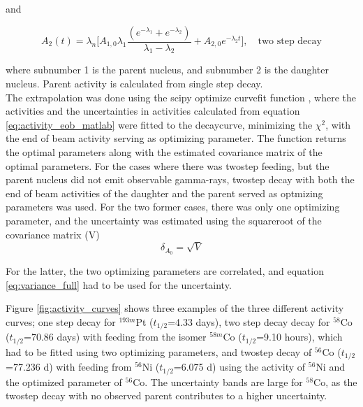 and

\begin{equation} \label{eq:twostep_activity}
    A_2(t) = \lambda_n \Big[ A_{1,0}\lambda_1 \frac{(e^{-\lambda_1 } + e^{-\lambda_2})}{\lambda_1 - \lambda _2} + A_{2,0}e^{-\lambda_2 t} \Big],\quad \text{two step decay}
\end{equation}

where subnumber 1 is the parent nucleus, and subnumber 2 is the daughter nucleus. Parent activity is calculated from single step decay. \\

\noindent The extrapolation was done using the scipy optimize curvefit function \cite{Virtanen2020}, where the activities and the uncertainties in activities calculated from equation \ref{eq:activity_eob_matlab} were fitted to the decaycurve, minimizing the $\chi^2$, with the end of beam activity serving as optimizing parameter. The function returns the optimal parameters along with the estimated covariance matrix of the optimal parameters. For the cases where there was twostep feeding, but the parent nucleus did not emit observable gamma-rays, twostep decay with both the end of beam activities of the daughter and the parent served as optmizing parameters was used. For the two former cases, there was only one optimizing parameter, and the uncertainty was estimated using the squareroot of the covariance matrix (V)
\begin{equation}
    \delta_{A_0}=\sqrt{{V}}
\end{equation}

For the latter, the two optimizing parameters are correlated, and equation \ref{eq:variance_full} had to be used for the uncertainty. 



\noindent 
Figure \ref{fig:activity_curves} shows three examples of the three different activity curves; one step decay for $^{193m}$Pt ($t_{1/2}$=4.33 days), two step decay decay for $^{58}$Co ($t_{1/2}$=70.86 days) with feeding from the isomer $^{58m}$Co ($t_{1/2}$=9.10 hours), which had to be fitted using two optimizing parameters, and twostep decay of $^{56}$Co ($t_{1/2}$=77.236 d) with feeding from $^{56}$Ni ($t_{1/2}$=6.075 d) using the activity of $^{56}$Ni and the optimized parameter of $^{56}$Co. The uncertainty bands are large for $^{58}$Co, as the twostep decay with no observed parent contributes to a higher uncertainty. 


